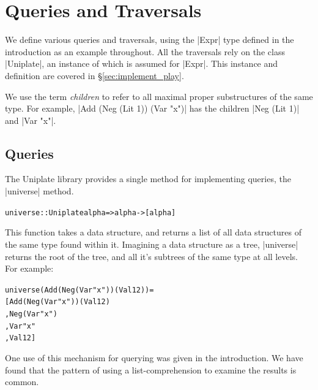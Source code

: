 \documentclass[preprint]{sigplanconf}
\newcommand{\pic}[1]{\texttt{[image: \#1.eps]}}
\newenvironment{code}{\begin{alltt}\small}{\end{alltt}}
\begin{document}
\section{Queries and Traversals}
\label{sec:use_play}

We define various queries and traversals, using the |Expr| type defined in the introduction as an example throughout. All the traversals rely on the class |Uniplate|, an instance of which is assumed for |Expr|. This instance and definition are covered in \S\ref{sec:implement_play}.

We use the term \textit{children} to refer to all maximal proper substructures of the same type. For example, |Add (Neg (Lit 1)) (Var "x")| has the children |Neg (Lit 1)| and |Var "x"|.

\subsection{Queries}

The Uniplate library provides a single method for implementing queries, the |universe| method.

\begin{code}
universe :: Uniplate alpha => alpha -> [alpha]
\end{code}

This function takes a data structure, and returns a list of all data structures of the same type found within it. Imagining a data structure as a tree, |universe| returns the root of the tree, and all it's subtrees of the same type at all levels. For example:

\begin{code}
universe (Add (Neg (Var "x")) (Val 12)) =
    [Add (Neg (Var "x")) (Val 12)
    ,Neg (Var "x")
    ,Var "x"
    ,Val 12]
\end{code}

One use of this mechanism for querying was given in the introduction. We have found that the pattern of using a list-comprehension to examine the results is common.
\end{document}
